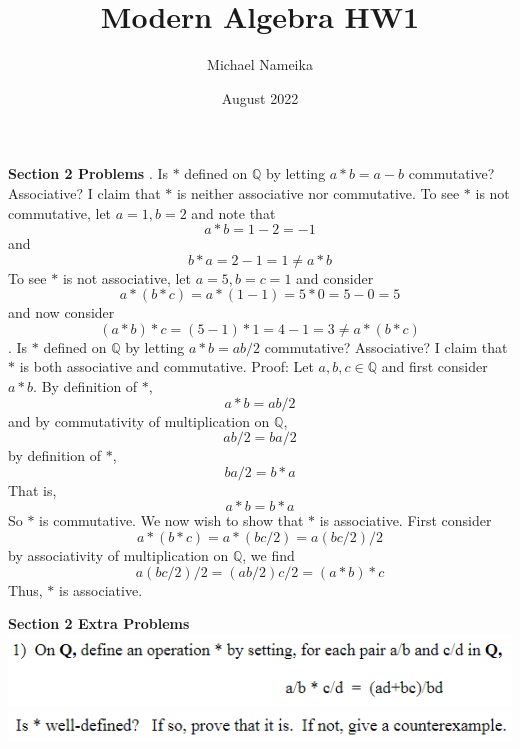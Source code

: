 \documentclass{article}
\title{Modern Algebra HW1}
\author{Michael Nameika}
\date{August 2022}
\begin{document}
\maketitle

\Large{\textbf{Section 2 Problems}}
\newline{}. Is $*$ defined on $\mathbb{Q}$ by letting $a * b = a - b$ commutative? Associative? 
\newline
I claim that $*$ is neither associative nor commutative. To see $*$ is not commutative, let $a = 1, b = 2$ and note that
\[a * b = 1 - 2 = -1\]
and
\[b * a = 2 - 1 = 1 \neq a * b\]
To see $*$ is not associative, let $a = 5, b=c=1$ and consider
\[a* (b * c) = a * (1 - 1) = 5 * 0 = 5 - 0 = 5\]
and now consider
\[(a * b) * c = (5 - 1) * 1 = 4 - 1 = 3 \neq a * (b * c)\]
\newline{}. Is $*$ defined on $\mathbb{Q}$ by letting $a * b = ab/2$ commutative? Associative?
\newline
I claim that $*$ is both associative and commutative. 
\newline
Proof: Let $a,b,c \in \mathbb{Q}$ and first consider $a * b$. By definition of $*$,
\[a * b = ab/2\]
and by commutativity of multiplication on $\mathbb{Q}$,
\[ab/2 = ba/2\]
by definition of $*$,
\[ba/2 = b * a\]
That is,
\[a * b = b * a\]
So $*$ is commutative. We now wish to show that $*$ is associative. First consider
\[a * (b * c) = a * (bc/2) = a(bc/2)/2\]
by associativity of multiplication on $\mathbb{Q}$, we find
\[a(bc/2)/2 = (ab/2)c/2 = (a * b) * c\]
Thus, $*$ is associative.
\newline\newline

\Large{\textbf{Section 2 Extra Problems}}
\newline
\includegraphics[]{extra problem1.PNG}
\newline
\includegraphics[]{well defined.PNG}
\newline\newline
\end{document}
